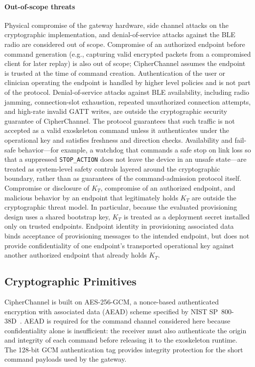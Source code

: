 \documentclass[journal]{IEEEtran}
\begin{document}
\paragraph{Out-of-scope threats}
Physical compromise of the gateway hardware, side channel attacks on the cryptographic implementation, and denial-of-service attacks against the BLE radio are considered out of scope. Compromise of an authorized endpoint before command generation (e.g., capturing valid encrypted packets from a compromised client for later replay) is also out of scope; CipherChannel assumes the endpoint is trusted at the time of command creation. Authentication of the user or clinician operating the endpoint is handled by higher level policies and is not part of the protocol.
Denial-of-service attacks against BLE availability, including radio jamming, connection-slot exhaustion, repeated unauthorized connection attempts, and high-rate invalid GATT writes, are outside the cryptographic security guarantee of CipherChannel. The protocol guarantees that such traffic is not accepted as a valid exoskeleton command unless it authenticates under the operational key and satisfies freshness and direction checks. Availability and fail-safe behavior---for example, a watchdog that commands a safe stop on link loss so that a suppressed \texttt{STOP\_ACTION} does not leave the device in an unsafe state---are treated as system-level safety controls layered around the cryptographic boundary, rather than as guarantees of the command-admission protocol itself.
Compromise or disclosure of \(K_T\), compromise of an authorized endpoint, and malicious behavior by an endpoint that legitimately holds \(K_T\) are outside the cryptographic threat model. In particular, because the evaluated provisioning design uses a shared bootstrap key, \(K_T\) is treated as a deployment secret installed only on trusted endpoints. Endpoint identity in provisioning associated data binds acceptance of provisioning messages to the intended endpoint, but does not provide confidentiality of one endpoint's transported operational key against another authorized endpoint that already holds \(K_T\).

\subsection{Cryptographic Primitives}

CipherChannel is built on AES-256-GCM, a nonce-based authenticated encryption with associated data (AEAD) scheme specified by NIST SP~800-38D~\cite{nist_sp800_38d}. AEAD is required for the command channel considered here because confidentiality alone is insufficient: the receiver must also authenticate the origin and integrity of each command before releasing it to the exoskeleton runtime. The 128-bit GCM authentication tag provides integrity protection for the short command payloads used by the gateway.
\end{document}
